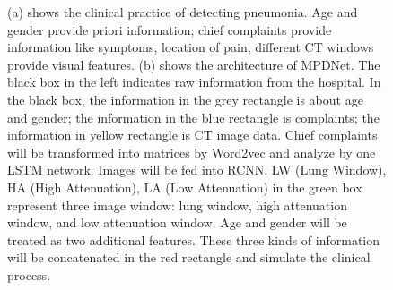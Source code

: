 \documentclass[journal]{IEEEtran}
\begin{document}
\begin{figure}[htbp]
    \centering
    \caption{(a) shows the clinical practice of detecting pneumonia. Age and gender provide priori information; chief complaints provide information like symptoms, location of pain, different CT windows provide visual features. (b) shows the architecture of MPDNet. The black box in the left indicates raw information from the hospital. In the black box, the information in the grey rectangle is about age and gender; the information in the blue rectangle is complaints; the information in yellow rectangle is CT image data. Chief complaints will be transformed into matrices by Word2vec and analyze by one LSTM network. Images will be fed into RCNN. LW (Lung Window), HA (High Attenuation), LA (Low Attenuation) in the green box represent three image window: lung window, high attenuation window, and low attenuation window. Age and gender will be treated as two additional features. These three kinds of information will be concatenated in the red rectangle and simulate the clinical process.
    }
    \label{MMDD}
    \end{figure}
\end{document}
